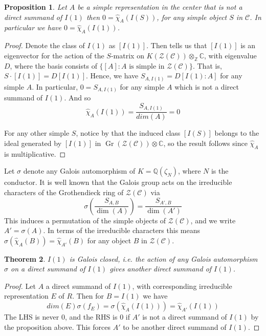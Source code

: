 \documentclass[a4paper,twoside,11pt]{amsart}
\newtheorem{theorem}{Theorem}[section]
\newtheorem{proposition}[theorem]{Proposition}
\theoremstyle{plain} %
\theoremstyle{definition}
\begin{document}
\begin{proposition}
    Let $A$ be a simple representation in the center that is not a direct summand of $I(1)$ then $0=\widehat{\chi}_A (I(S))$, for any simple object $S$ in $\mathcal{C}$. In particular we have $0=\widehat{\chi}_A (I(1))$.
\end{proposition}
\begin{proof}
    Denote the class of $I(1)$ as $[I(1)]$. Then \cite[Proposition 2.8]{O2} tells us that $[I(1)]$ is an eigenvector for the action of the $S$-matrix on $K(\mathcal Z(\mathcal C))\otimes_{\mathbb Z}\mathbb C$, with eigenvalue $D$, where the basis consists of $\{[A] : A \text{ is simple in } \mathcal Z(\mathcal C)\}$. That is, $S\cdot [I(1)]=D[I(1)]$. Hence, we have $S_{A,I(1)}=D[I(1):A]$ for any simple $A$. In particular, $0=S_{A,I(1)}$ for any simple $A$ which is not a direct summand of $I(1)$. And so 
    \begin{equation}
        \widehat{\chi}_A (I(1))=\frac{S_{A,I(1)}}{dim(A)}=0
    \end{equation}
    
For any other simple $S$, notice by \cite[Lemma 8.12.2]{EGNO} that the induced class $[I(S)]$ belongs to the ideal generated by $[I(1)]$ in $\operatorname{Gr}(\mathcal Z(\mathcal C))\otimes\mathbb C$, so the result follows since $\widehat{\chi}_A $ is multiplicative.
    
   \end{proof}
   \medskip
    
   

     Let $\sigma$ denote any Galois automorphism of $K=\mathbb{Q}(\zeta_N)$, where $N$ is the conductor. It is well known that the Galois group acts on the irreducible characters of the Grothendieck ring of $\mathcal{Z}(\mathcal{C})$ via
    \begin{equation}
        \sigma\left(\frac{S_{A,B}}{\dim(A)}\right)
=
\frac{S_{A',B}}{\dim(A')}
    \end{equation}
     This induces a permutation of the simple objects of $\mathcal{Z}(\mathcal{C})$, and we write $A'=\sigma(A)$. In terms of the irreducible characters this means $\sigma(\widehat{\chi}_A (B))=\widehat{\chi}_{A'} (B)$ for any object $B$ in $\mathcal{Z}(\mathcal{C})$.
\begin{theorem}
    $I(1)$ is Galois closed, i.e. the action of any Galois automorphism $\sigma$ on a direct summand of $I(1)$ gives another direct summand of $I(1)$.
\end{theorem}
\begin{proof}
Let $A$ a direct summand of $I(1)$, with corresponding irreducible representation $E$ of $R$. Then for $B=I(1)$ we have
    \begin{equation}
        dim(E)\sigma(f_E)=\sigma(\widehat{\chi}_A (I(1)))=\widehat{\chi}_{A'} (I(1))
    \end{equation}
    The LHS is never $0$, and the RHS is $0$ if $A'$ is not a direct summand of $I(1)$ by the proposition above. This forces $A'$ to be another direct summand of $I(1)$.
\end{proof}
\end{document}
